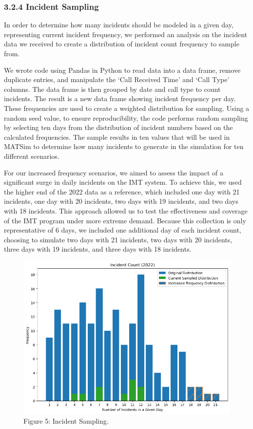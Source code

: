 \documentclass[
  letterpaper,
  DIV=11,
  numbers=noendperiod]{scrreprt}
\begin{document}
\hypertarget{incident-sampling}{%
\subsubsection{3.2.4 Incident Sampling}\label{incident-sampling}}

In order to determine how many incidents should be modeled in a given
day, representing current incident frequency, we performed an analysis
on the incident data we received to create a distribution of incident
count frequency to sample from.

We wrote code using Pandas in Python to read data into a data frame,
remove duplicate entries, and manipulate the `Call Received Time' and
`Call Type' columns. The data frame is then grouped by date and call
type to count incidents. The result is a new data frame showing incident
frequency per day. These frequencies are used to create a weighted
distribution for sampling. Using a random seed value, to ensure
reproducibility, the code performs random sampling by selecting ten days
from the distribution of incident numbers based on the calculated
frequencies. The sample results in ten values that will be used in
MATSim to determine how many incidents to generate in the simulation for
ten different scenarios.

For our increased frequency scenarios, we aimed to assess the impact of
a significant surge in daily incidents on the IMT system. To achieve
this, we used the higher end of the 2022 data as a reference, which
included one day with 21 incidents, one day with 20 incidents, two days
with 19 incidents, and two days with 18 incidents. This approach allowed
us to test the effectiveness and coverage of the IMT program under more
extreme demand. Because this collection is only representative of 6
days, we included one additional day of each incident count, choosing to
simulate two days with 21 incidents, two days with 20 incidents, three
days with 19 incidents, and three days with 18 incidents.

\begin{figure}

{\centering \includegraphics{figures/fig5.png}

}

\caption{Figure 5: Incident Sampling.}

\end{figure}
\end{document}
